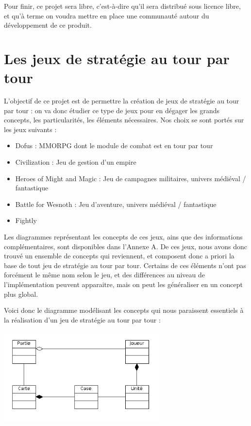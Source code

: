 \documentclass[a4paper,10pt]{report}
\begin{document}
      Pour finir, ce projet sera libre, c'est-à-dire qu'il sera distribué sous licence libre, et qu'à terme on voudra mettre en place une communauté autour du développement de ce produit. 


    \section{Les jeux de stratégie au tour par tour}

      L'objectif de ce projet est de permettre la création de jeux de stratégie au tour par tour : on va donc étudier ce type de jeux pour en dégager les grands concepts, les particularités, les éléments nécessaires. Nos choix se sont portés sur les jeux suivants : 

      \begin{itemize}
        \item Dofus : MMORPG dont le module de combat est en tour par tour
        \item Civilization : Jeu de gestion d'un empire
        \item Heroes of Might and Magic : Jeu de campagnes militaires, univers médiéval / fantastique
        \item Battle for Wesnoth : Jeu d'aventure, univers médiéval / fantastique
        \item Fightly
      \end{itemize}

      Les diagrammes représentant les concepts de ces jeux, ains que des informations complémentaires, sont disponibles dans l'Annexe A. De ces jeux, nous avons donc trouvé un ensemble de concepts qui reviennent, et composent donc a priori la base de tout jeu de stratégie au tour par tour. Certains de ces éléments n'ont pas forcément le même nom selon le jeu, et des différences au niveau de l'implémentation peuvent apparaitre, mais on peut les généraliser en un concept plus global. 

      Voici donc le diagramme modélisant les concepts qui nous paraissent essentiels à la réalisation d'un jeu de stratégie au tour par tour : 
      
      \includegraphics[width=320px]{diagrammes/concept-fightly.png}
      
\end{document}
